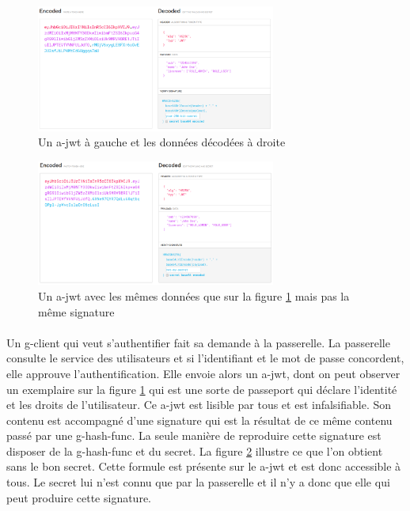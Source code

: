 \begin{figure}[h]
    \centering
    \includegraphics[width=0.7\textwidth]{images/screenshot/jwt-good-secret.png}
    \caption{Un \gls{a-jwt} à gauche et les données décodées à droite}
    \label{fig:jwt-good}
\end{figure}
\begin{figure}[h]
    \centering
    \includegraphics[width=0.7\textwidth]{images/screenshot/jwt-bad-secret.png}
    \caption{Un \gls{a-jwt} avec les mêmes données que sur la figure \ref{fig:jwt-good} mais pas la même signature}
    \label{fig:jwt-bad}
\end{figure}

\paragraph{}
Un \gls{g-client} qui veut s'authentifier fait sa demande à la passerelle. La passerelle consulte le service des utilisateurs et si l'identifiant et le mot de passe concordent, elle approuve l'authentification. Elle envoie alors un \gls{a-jwt}, dont on peut observer un exemplaire sur la figure \ref{fig:jwt-good} qui est une sorte de passeport qui déclare l'identité et les droits de l'utilisateur. Ce \gls{a-jwt} est lisible par tous et est infalsifiable. Son contenu est accompagné d'une signature qui est la résultat de ce même contenu passé par une \gls{g-hash-func}. La seule manière de reproduire cette signature est disposer de la \gls{g-hash-func} et du secret. La figure \ref{fig:jwt-bad} illustre ce que l'on obtient sans le bon secret. Cette formule est présente sur le \gls{a-jwt} et est donc accessible à tous. Le secret lui n'est connu que par la passerelle et il n'y a donc que elle qui peut produire cette signature.

